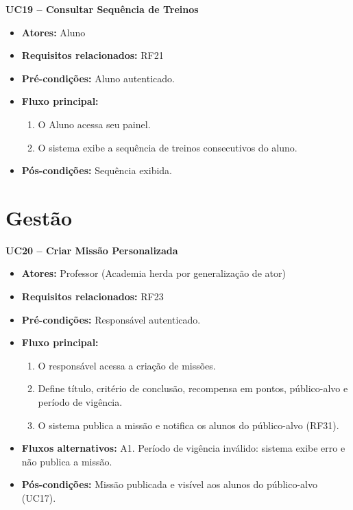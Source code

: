 \noindent\textbf{UC19 -- Consultar Sequência de Treinos}
\begin{itemize}[leftmargin=*, itemsep=0pt, topsep=2pt]
  \item \textbf{Atores:} Aluno
  \item \textbf{Requisitos relacionados:} RF21
  \item \textbf{Pré-condições:} Aluno autenticado.
  \item \textbf{Fluxo principal:}
  \begin{enumerate}[label=\arabic*., itemsep=0pt, topsep=0pt]
    \item O Aluno acessa seu painel.
    \item O sistema exibe a sequência de treinos consecutivos do aluno.
  \end{enumerate}
  \item \textbf{Pós-condições:} Sequência exibida.
\end{itemize}
\medskip

\section*{Gestão}

\noindent\textbf{UC20 -- Criar Missão Personalizada}
\begin{itemize}[leftmargin=*, itemsep=0pt, topsep=2pt]
  \item \textbf{Atores:} Professor (Academia herda por generalização de ator)
  \item \textbf{Requisitos relacionados:} RF23
  \item \textbf{Pré-condições:} Responsável autenticado.
  \item \textbf{Fluxo principal:}
  \begin{enumerate}[label=\arabic*., itemsep=0pt, topsep=0pt]
    \item O responsável acessa a criação de missões.
    \item Define título, critério de conclusão, recompensa em pontos, público-alvo e período de vigência.
    \item O sistema publica a missão e notifica os alunos do público-alvo (RF31).
  \end{enumerate}
  \item \textbf{Fluxos alternativos:} A1. Período de vigência inválido: sistema exibe erro e não publica a missão.
  \item \textbf{Pós-condições:} Missão publicada e visível aos alunos do público-alvo (UC17).
\end{itemize}
\medskip

